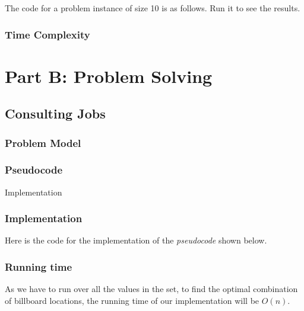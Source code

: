 \documentclass{article}
\begin{document}
The code for a problem instance of size 10 is as follows. Run it to see the results.



\subsubsection*{Time Complexity}


\section*{Part B: Problem Solving}


\subsection*{Consulting Jobs}

\subsubsection*{Problem Model}

\subsubsection*{Pseudocode}

\begin{algorithm}[H]
\caption{Implementation}
\begin{algorithmic}[1]
\end{algorithmic}
\end{algorithm}

\subsubsection*{Implementation}

Here is the code for the implementation of the \textit{pseudocode} shown below.



\subsubsection*{Running time}
As we have to run over all the values in the set, to find the optimal combination of billboard locations, the running time of our implementation will be $O(n)$.

\end{document}
